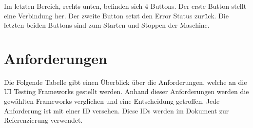 		Im letzten Bereich, rechts unten, befinden sich 4 Buttons. Der erste Button stellt eine Verbindung her. Der zweite Button setzt den Error Status zurück. Die letzten beiden Buttons sind zum Starten und Stoppen der Maschine.
		 
		 \newpage
	\section{Anforderungen}
		\paragraph{} Die Folgende Tabelle gibt einen Überblick über die Anforderungen, welche an die UI Testing Frameworks gestellt werden. Anhand dieser Anforderungen werden die gewählten Frameworks verglichen und eine Entscheidung getroffen. Jede Anforderung ist mit einer ID versehen. Diese IDs werden im Dokument zur Referenzierung verwendet.
					
